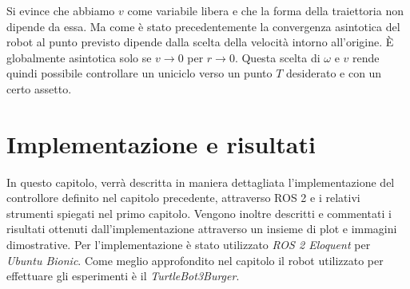 \documentclass[a4paper,11 pt,oneside]{book}
\theoremstyle{definition}
\begin{document}
Si evince che abbiamo $v$ come variabile libera e che la forma della traiettoria non dipende da essa.
Ma come è stato precedentemente la convergenza asintotica del robot al punto previsto dipende dalla scelta della velocità intorno all'origine. È globalmente asintotica solo se $v\to 0$ per $r \to 0$.  
Questa scelta di $\omega $ e $v$ rende quindi possibile controllare un uniciclo verso un punto $T$ desiderato e con un certo assetto. 


\chapter{Implementazione e risultati}
In questo capitolo, verrà descritta in maniera dettagliata l'implementazione del controllore definito nel capitolo precedente, attraverso ROS 2 e i relativi strumenti spiegati nel primo capitolo. Vengono inoltre descritti e commentati i risultati ottenuti dall'implementazione attraverso un insieme di plot e immagini dimostrative. Per l'implementazione è stato utilizzato \emph{ROS 2 Eloquent} per \emph{Ubuntu Bionic}. Come meglio approfondito nel capitolo il robot utilizzato per effettuare gli esperimenti è il \emph{TurtleBot3Burger}.
\end{document}
